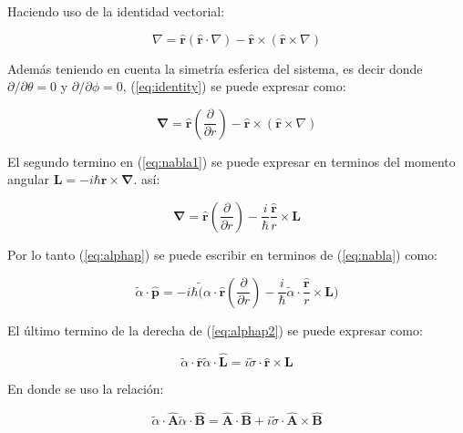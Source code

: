 \documentclass[a4paper, 12pt]{article} %
\begin{document}
Haciendo uso de la identidad vectorial: 

\begin{equation}\label{eq:identity}
\nabla = \hat{\mathbf{r}}(\hat{\mathbf{r}}\cdot \nabla) - \hat{\mathbf{r}} \times (\hat{\mathbf{r}} \times \nabla)  
\end{equation}

Adem\'as teniendo en cuenta la simetr\'ia esferica del sistema, es decir donde $\partial/\partial \theta = 0$
y $\partial/\partial \phi = 0$,  (\ref{eq:identity}) se puede expresar como:

\begin{equation}\label{eq:nabla1}
\mathbf\nabla = \hat{\mathbf{r}}(\dfrac{\partial}{\partial r}) - \hat{\mathbf{r}} \times (\hat{\mathbf{r}} \times \nabla)
\end{equation}

El segundo termino en (\ref{eq:nabla1}) se puede expresar en terminos del momento angular $\mathbf{L} = -i\hbar \mathbf{r} \times \mathbf{\nabla}$.
as\'i:

\begin{equation}\label{eq:nabla}
\mathbf{\nabla} =  \hat{\mathbf{r}}(\dfrac{\partial}{\partial r}) - \dfrac{i}{\hbar}\dfrac{\hat{\mathbf{r}}}{r} \times \mathbf{L}
\end{equation}

Por lo tanto (\ref{eq:alphap}) se puede escribir en terminos de (\ref{eq:nabla}) como:

\begin{equation}\label{eq:alphap2}
\widetilde{\alpha}\cdot \mathbf{\hat{p}} = -i\hbar \widetilde({\alpha}\cdot \hat{\mathbf{r}}(\dfrac{\partial}{\partial r}) - 
\dfrac{i}{\hbar}\widetilde{\alpha}\cdot \dfrac{\hat{\mathbf{r}}}{r} \times \mathbf{L})
\end{equation}

El \'ultimo termino de la derecha de (\ref{eq:alphap2}) se puede expresar como:

\begin{equation}\label{eq:prop1}
\widetilde{\alpha}\cdot\hat{\mathbf{r}}\widetilde{\alpha} \cdot \hat{\mathbf{L}} = i\widetilde{\sigma}\cdot \hat{\mathbf{r}} \times \mathbf{L}
\end{equation}

En donde se uso la relaci\'on:

\begin{equation}
\widetilde{\alpha}\cdot \hat{\mathbf{A}}\widetilde{\alpha}\cdot \hat{\mathbf{B}}
= \hat{\mathbf{A}} \cdot \hat{\mathbf{B}} +  i\widetilde{\sigma}\cdot \hat{\mathbf{A}}\times \hat{\mathbf{B}}
\end{equation}
\end{document}
